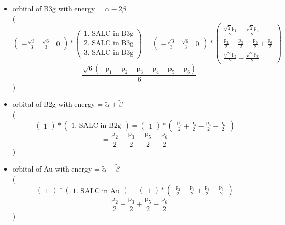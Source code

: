 \documentclass[12pt,a4paper]{article}
\begin{document}
\begin{itemize}
\item orbital of B3g with energy = 
                                $\tilde{\alpha} - 2 \tilde{\beta}$ \\
( 
$$
\begin{pmatrix}- \frac{\sqrt{3}}{3} & \frac{\sqrt{6}}{3} & 0\end{pmatrix} * \left(\begin{array}{c}\text{1. SALC in B3g} \\ \text{2. SALC in B3g} \\ \text{3. SALC in B3g}\end{array}\right) = \begin{pmatrix}- \frac{\sqrt{3}}{3} & \frac{\sqrt{6}}{3} & 0\end{pmatrix} * \begin{pmatrix}\frac{\sqrt{2} \text{p}_{1}}{2} - \frac{\sqrt{2} \text{p}_{4}}{2}\\\frac{\text{p}_{2}}{2} - \frac{\text{p}_{3}}{2} - \frac{\text{p}_{5}}{2} + \frac{\text{p}_{6}}{2}\\\frac{\sqrt{2} \text{p}_{7}}{2} - \frac{\sqrt{2} \text{p}_{8}}{2}\end{pmatrix} 
 $$ $$ = \frac{\sqrt{6} \left(- \text{p}_{1} + \text{p}_{2} - \text{p}_{3} + \text{p}_{4} - \text{p}_{5} + \text{p}_{6}\right)}{6} 
 $$ 
 )

\item orbital of B2g with energy = 
                                $\tilde{\alpha} + \tilde{\beta}$ \\
( 
$$
\begin{pmatrix}1\end{pmatrix} * \left(\begin{array}{c}\text{1. SALC in B2g}\end{array}\right) = \begin{pmatrix}1\end{pmatrix} * \begin{pmatrix}\frac{\text{p}_{2}}{2} + \frac{\text{p}_{3}}{2} - \frac{\text{p}_{5}}{2} - \frac{\text{p}_{6}}{2}\end{pmatrix} 
 $$ $$ = \frac{\text{p}_{2}}{2} + \frac{\text{p}_{3}}{2} - \frac{\text{p}_{5}}{2} - \frac{\text{p}_{6}}{2} 
 $$ 
 )

\item orbital of Au with energy = 
                                $\tilde{\alpha} - \tilde{\beta}$ \\
( 
$$
\begin{pmatrix}1\end{pmatrix} * \left(\begin{array}{c}\text{1. SALC in Au}\end{array}\right) = \begin{pmatrix}1\end{pmatrix} * \begin{pmatrix}\frac{\text{p}_{2}}{2} - \frac{\text{p}_{3}}{2} + \frac{\text{p}_{5}}{2} - \frac{\text{p}_{6}}{2}\end{pmatrix} 
 $$ $$ = \frac{\text{p}_{2}}{2} - \frac{\text{p}_{3}}{2} + \frac{\text{p}_{5}}{2} - \frac{\text{p}_{6}}{2} 
 $$ 
 )

\end{itemize}
\end{document}
